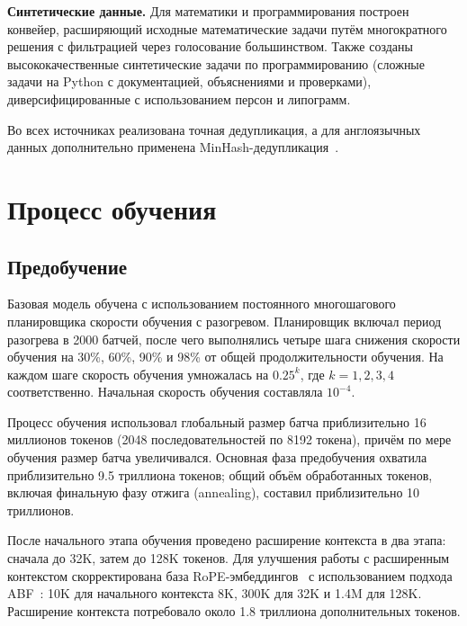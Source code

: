 \textbf{Синтетические данные.} Для математики и программирования построен конвейер, расширяющий исходные математические задачи путём многократного решения с фильтрацией через голосование большинством. Также созданы высококачественные синтетические задачи по программированию (сложные задачи на Python с документацией, объяснениями и проверками), диверсифицированные с использованием персон и липограмм.

Во всех источниках реализована точная дедупликация, а для англоязычных данных дополнительно применена MinHash-дедупликация~\cite{broder1997resemblance}.

\section{Процесс обучения}\label{sec:gc_training}

\subsection{Предобучение}\label{subsec:gc_pretrain}

Базовая модель обучена с использованием постоянного многошагового планировщика скорости обучения с разогревом. Планировщик включал период разогрева в 2000 батчей, после чего выполнялись четыре шага снижения скорости обучения на 30\%, 60\%, 90\% и 98\% от общей продолжительности обучения. На каждом шаге скорость обучения умножалась на $0.25^k$, где $k = 1, 2, 3, 4$ соответственно. Начальная скорость обучения составляла $10^{-4}$.

Процесс обучения использовал глобальный размер батча приблизительно 16 миллионов токенов (2048 последовательностей по 8192 токена), причём по мере обучения размер батча увеличивался. Основная фаза предобучения охватила приблизительно 9.5 триллиона токенов; общий объём обработанных токенов, включая финальную фазу отжига (annealing), составил приблизительно 10 триллионов.

После начального этапа обучения проведено расширение контекста в два этапа: сначала до 32K, затем до 128K токенов. Для улучшения работы с расширенным контекстом скорректирована база RoPE-эмбеддингов~\cite{su2024rope} с использованием подхода ABF~\cite{xiong2023effective}: 10K для начального контекста 8K, 300K для 32K и 1.4M для 128K. Расширение контекста потребовало около 1.8 триллиона дополнительных токенов.

